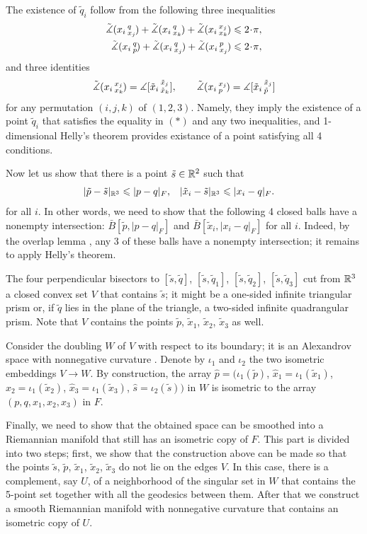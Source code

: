 \documentclass{article}
\begin{document}
The existence of $\tilde q_i$ follow from the following three inequalities
\[
\begin{aligned}
\angk{x_i}{q}{x_j}+\angk{x_i}{q}{x_k}+\angk{x_i}{x_j}{x_k}&\le 2\cdot\pi,
\\
\angk{x_i}{q}{p}+\angk{x_i}{q}{x_j}+\angk{x_i}{p}{x_j}&\le 2\cdot\pi,
\end{aligned}
\]
and three identities
\[\tilde\measuredangle(x_i\,{}^{x_j}_{x_k}\hspace{-0.2ex})=\measuredangle[\tilde x_i\,{}^{\tilde x_j}_{\tilde x_k}],
\qquad
\tilde\measuredangle(x_i\,{}^{x_j}_{p}\hspace{-0.2ex})=\measuredangle[\tilde x_i\,{}^{\tilde x_j}_{\tilde p}]
\]
for any permutation $(i,j,k)$ of $(1,2,3)$.
Namely, they imply the existence of a point $\tilde q_i$ that satisfies the equality in $({*})$ and any two inequalities,
and 1-dimensional Helly's theorem provides existance of a point satisfying all 4 conditions.

Now let us show that there is a point $\tilde s\in\mathbb{R}^2$ such that
\begin{align*}
|\tilde p-\tilde s|_{\mathbb{R}^3}&\leqslant|p-q|_F,
&
|\tilde x_i-\tilde s|_{\mathbb{R}^3}&\leqslant|x_i-q|_F.
\end{align*}
for all $i$.
In other words, we need to show that the following 4 closed balls have a nonempty intersection: 
$\bar B[\tilde p,|p-q|_F]$ and
$\bar B[\tilde x_i,|x_i-q|_F]$ for all $i$.
Indeed, by the overlap lemma \cite{alexander2019alexandrov}, any 3 of these balls have a nonempty intersection;
it remains to apply Helly's theorem.

The four perpendicular bisectors to 
$[\tilde s, \tilde q]$, 
$[\tilde s, \tilde q_1]$, 
$[\tilde s, \tilde q_2]$, 
$[\tilde s, \tilde q_3]$ cut from $\mathbb{R}^3$ a closed convex set $V$ that contains $\tilde s$;
it might be a one-sided infinite triangular prism or, if $\tilde q$ lies in the plane of the triangle, a two-sided infinite quadrangular prism.
Note that $V$ contains the points $\tilde p$, $\tilde x_1$, $\tilde x_2$, $\tilde x_3$ as well.

Consider the doubling $W$ of $V$ with respect to its boundary;
it is an Alexandrov space with nonnegative curvature \cite[5.2]{perelman:spaces2}.
Denote by $\iota_1$ and $\iota_2$ the two isometric embeddings $V\to W$.
By construction, the array $\hat p=(\iota_1(\tilde p)$, $\hat x_1=\iota_1(\tilde x_1)$, $\hat x_2=\iota_1(\tilde x_2)$, $\hat x_3=\iota_1(\tilde x_3)$,  $\hat s=\iota_2(\tilde s))$ in $W$ is isometric to the array $(p, q, x_1, x_2, x_3)$ in $F$.

Finally, we need to show that the obtained space can be smoothed into a Riemannian manifold that still has an isometric copy of $F$.
This part is divided into two steps; first, we show that the construction above can be made so that the points $\tilde s$, $\tilde p$, $\tilde x_1$, $\tilde x_2$, $\tilde x_3$ do not lie on the edges $V$.
In this case, there is a complement, say $U$, of a neighborhood of the singular set in $W$ that contains
the 5-point set together with all the geodesics between them.
After that we construct a smooth Riemannian manifold with nonnegative curvature that contains an isometric copy of $U$.
\end{document}
